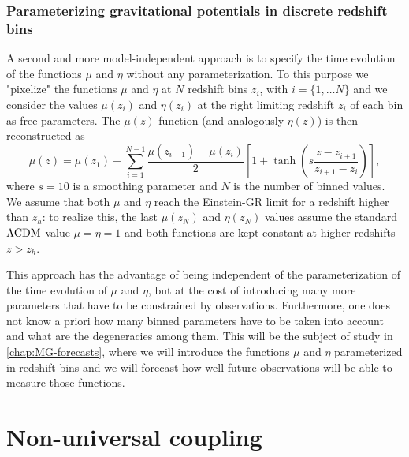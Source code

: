 \subsubsection{Parameterizing gravitational potentials in discrete redshift bins \label{sub:param-z-bins-th}}

A second and more model-independent approach
is to specify the time evolution of the functions $\mu$ and $\eta$ without
any parameterization.
To this purpose we "pixelize" the functions $\mu$ and $\eta$ at $N$ redshift bins $z_i$, with $i=\{1, \ldots N  \}$ 
and we consider the values
$\mu(z_{i})$ and $\eta(z_{i})$ at the right limiting redshift $z_{i}$
of each bin as free parameters.
The $\mu(z)$ function (and analogously $\eta(z)$) is then reconstructed
as 
\begin{equation}\label{eq:MGbin-mu-general-parametrization}
\mu(z)=\mu(z_{1})+\sum_{i=1}^{N-1}{\frac{\mu(z_{i+1})-\mu(z_{i})}{2}\left[1+\tanh{\left(s\frac{z-z_{i+1}}{z_{i+1}-z_{i}}\right)}\right]},
\end{equation}
where $s=10$ is a smoothing parameter and $N$ is the number of binned
values. We assume that both $\mu$ and $\eta$ reach the Einstein-GR limit
for a redshift higher than $z_h$: to realize this, the last $\mu(z_{N})$ and $\eta(z_{N})$
values assume the standard $\Lambda\mathrm{CDM}$ value $\mu=\eta=1$ and both functions
are kept constant at higher redshifts $z> z_h$.

This approach has the advantage of being independent of the parameterization of the time evolution of $\mu$ and $\eta$,
but at the cost of introducing
many more parameters that have to be constrained by observations.
Furthermore, one does not know a priori how many binned parameters have to be taken into account
and what are the degeneracies among them.
This will be the subject of study in \cref{chap:MG-forecasts}, where we will
introduce the functions $\mu$ and $\eta$ parameterized in redshift bins and we will forecast
how well future observations will be able to measure those functions.



\section{Non-universal coupling \label{sec:nonuniversal-coupling}}

